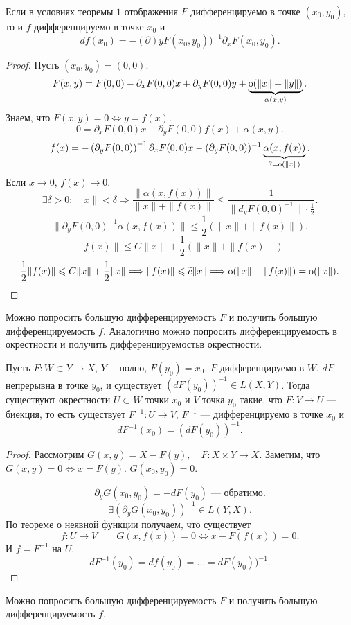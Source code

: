 \documentclass[11pt,dvipsnames]{report}
\begin{document}
\begin{thm}
    Если в условиях теоремы $ 1$ отображения  $ F$ дифференцируемо в точке  $ (x_0, y_0)$, то и $ f$ дифференцируемо в точке  $ x_0$ и 
    \[
	df(x_0) = -(\partial )yF(x_0, y_0))^{-1} \partial _x F(x_0, y_0)
    .\] 
\end{thm}
\begin{proof}
    Пусть $ (x_0, y_0) = (0, 0)$.
    \[
	F(x, y) = F(0, 0) - \partial _xF(0, 0)x + \partial _yF(0, 0) y +\underbrace{{\mathop{\text{\rm o}}}(\| x \|+ \|  y \| ) }_{\alpha (x, y)}
    .\] 
    Знаем, что $ F(x, y) = 0 \Longleftrightarrow y = f(x)$.
    \[
	0 = \partial _xF(0, 0) x + \partial _y F(0, 0)f(x) + \alpha (x, y)
    .\] 
    \[
	f(x) = -\left( \partial _y F(0, 0) \right)^{-1}\partial _x F(0, 0) x - (\partial _y F(0, 0))^{-1} \underbrace{\alpha (x, f(x))}_{?= {\mathop{\text{\rm o}}}(\| x \| )}
    .\] 
    Если $ x \to  0$, $ f(x) \to  0$.
    \[
	\exists \delta > 0\colon \|  x  \| < \delta \Longrightarrow \frac{ \|  \alpha (x, f(x))  \|}{\| x \| + \|  f(x) \| }  \le \frac{1}{\|  d_yF(0, 0)^{-1} \| \cdot \frac{1}{2} }
    .\] 
    \[
	\|  \partial _yF(0, 0)^{-1} \alpha (x, f(x)) \| \le \frac{1}{2}\left( \|  x \| + \|  f(x) \|  \right)  
    .\] 
    \[
	\| f(x) \| \le C \| x \| + \frac{1}{2} \left( \| x \| + \| f(x) \|   \right)  
    .\] 
    \[
	\frac{1}{2}\|  f(x) \| \leqslant  C \|  x \| + \frac{1}{2}  \| x \| \Longrightarrow  \| f(x)  \|\leqslant \widetilde{ c} \| x \|  \Longrightarrow  {\mathop{\text{\rm o}}}(\| x \|+\| f(x) \|) = {\mathop{\text{\rm o}}}(\| x \| )  
    .\] 
\end{proof}
\begin{note}
    Можно попросить большую дифференцируемость $ F$ и получить большую дифференцируемость  $ f$.  Аналогично можно попросить дифференцируемость в окрестности и получить дифференцируемостьв окрестности.
\end{note}
\begin{thm}
    Пусть  $ F\colon W \subset Y \to  X$, $ Y$--- полно, $ F(y_0) = x_0$, $ F$ дифференцируемо в  $ W$, $ dF$ непрерывна в точке   $ y_0$, и существует  $ \left( dF(y_0) \right)^{-1} \in L(X, Y) $. Тогда существуют окрестности $ U \subset W$ точки $ x_0 $ и $ V$ точка  $ y_0$ такие, что $ F \colon V \to  U$ --- биекция, то есть существует $ F^{-1} \colon U \to  V$, $ F ^{-1}$ --- дифференцируемо  в точке $ x_0$ и 
    \[
	dF^{-1}(x_0) = \left( dF(y_0) \right)^{-1}
    .\] 
\end{thm}
\begin{proof}
    Рассмотрим $ G(x, y) = X - F(y), \quad F\colon X \times Y \to  X$.
    Заметим, что $ G(x, y) = 0 \Longleftrightarrow x = F(y)$. 
    $ G(x_0, y_0) = 0$.

    \[
	\partial _yG(x_0, y_0) = -dF(y_0) \text{ --- обратимо}
    .\] 
    \[
	\exists (\partial _yG(x_0, y_0))^{-1} \in L(Y, X)
    .\] 
    По теореме о неявной функции получаем, что существует 
    \[
	f\colon U \to  V \qquad G(x, f(x) ) = 0 \Longleftrightarrow x - F(f(x))= 0
    .\] 
    И  $ f = F^{-1}$ на  $ U$.
    \[
	dF^{-1}(y_0) = df(y_0) = \ldots = dF(y_0))^{-1}
    .\] 
\end{proof}
\begin{note}
    Можно попросить большую дифференцируемость $ F$ и получить большую дифференцируемость  $ f$.
\end{note}
\end{document}
